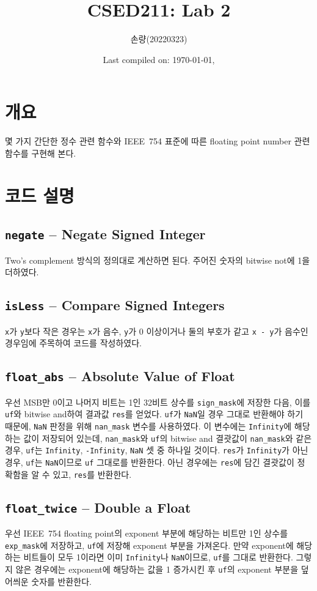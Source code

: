 \documentclass{scrartcl}
\title{CSED211: Lab 2}
\author{손량(20220323)}
\date{Last compiled on: \today, \currenttime}
\begin{document}
\maketitle

\section{개요}
몇 가지 간단한 정수 관련 함수와 IEEE~754 표준에 따른 floating point number 관련
함수를 구현해 본다.

\section{코드 설명}

\subsection{\texttt{negate} -- Negate Signed Integer}
Two's complement 방식의 정의대로 계산하면 된다. 주어진 숫자의 bitwise not에 1을
더하였다.

\subsection{\texttt{isLess} -- Compare Signed Integers}
\texttt{x}가 \texttt{y}보다 작은 경우는 \texttt{x}가 음수, \texttt{y}가 0
이상이거나 둘의 부호가 같고 \texttt{x - y}가 음수인 경우임에 주목하여 코드를
작성하였다.

\subsection{\texttt{float\_abs} -- Absolute Value of Float}
우선 MSB만 0이고 나머지 비트는 1인 32비트 상수를 \texttt{sign\_mask}에 저장한
다음, 이를 \texttt{uf}와 bitwise and하여 결과값 \texttt{res}를 얻었다.
\texttt{uf}가 \texttt{NaN}일 경우 그대로 반환해야 하기 때문에, \texttt{NaN}
판정을 위해 \texttt{nan\_mask} 변수를 사용하였다. 이 변수에는
\texttt{Infinity}에 해당하는 값이 저장되어 있는데, \texttt{nan\_mask}와
\texttt{uf}의 bitwise and 결괏값이 \texttt{nan\_mask}와 같은 경우,
\texttt{uf}는 \texttt{Infinity}, \texttt{-Infinity}, \texttt{NaN} 셋 중 하나일
것이다. \texttt{res}가 \texttt{Infinity}가 아닌 경우, \texttt{uf}는
\texttt{NaN}이므로 \texttt{uf} 그대로를 반환한다. 아닌 경우에는 \texttt{res}에
담긴 결괏값이 정확함을 알 수 있고, \texttt{res}를 반환한다.

\subsection{\texttt{float\_twice} -- Double a Float}
우선 IEEE~754 floating point의 exponent 부분에 해당하는 비트만 1인 상수를
\texttt{exp\_mask}에 저장하고, \texttt{uf}에 저장해 exponent 부분을 가져온다.
만약 exponent에 해당하는 비트들이 모두 1이라면 이미 \texttt{Infinity}나
\texttt{NaN}이므로, \texttt{uf}를 그대로 반환한다. 그렇지 않은 경우에는
exponent에 해당하는 값을 1 증가시킨 후 \texttt{uf}의 exponent 부분을 덮어씌운
숫자를 반환한다.
\end{document}
